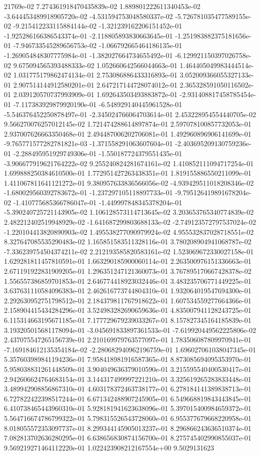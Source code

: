 21769e-02	7.274361918470435839e-02	1.889801222611340453e-02	-3.644453489918905720e-02	-4.531594753048580337e-02	-5.726781035477589155e-02	-9.215412233115884144e-02	-1.321239162206151452e-01	-1.925286166386543374e-01	-2.118805893830663645e-01	-1.251983882375181656e-01	-7.946733545289656753e-02	-1.066792665464186135e-01	-1.269054848307775984e-01	-1.382027664734655492e-01	-6.129921150397026758e-02	9.675094565393488333e-02	1.052660642566044663e-01	1.464405049983444514e-02	1.031775179862474134e-01	2.753086886433316893e-01	3.052009366055327133e-01	2.907514144912580201e-01	2.647217144728074012e-01	2.365328591050116502e-01	2.039120570737993909e-01	1.692643503493883872e-01	-2.931408817458785454e-01	-7.117383929879920190e-01	-6.548929140445961528e-01	-5.546376452250878497e-01	-2.345024766064703614e-01	2.453228954554440705e-02	9.566270076257012145e-02	1.721474288614897874e-01	2.597078100857732053e-01	2.937007626663350468e-01	2.494487006202706081e-01	1.492960896906141699e-01	-9.765771577282781821e-03	-1.371558291063607604e-01	-2.403695209130759236e-01	-2.288495951929749306e-01	-1.550187724379551435e-01	-3.906677919621764222e-02	9.255240824281674161e-02	1.410852111094717254e-01	1.699888250384610500e-01	1.772951427263438351e-01	1.819155886550211099e-01	1.411067811641121272e-01	9.380957633836566056e-02	-4.939429511018208346e-02	-1.680029560392783672e-01	-1.237297105118897733e-01	-9.795126419891678204e-02	-1.410775685366786047e-01	-1.449997848345378204e-01	-5.390240725721143905e-02	1.106128573114713645e-02	3.203653765340774839e-02	2.482212402519948929e-02	-1.641687299803688133e-02	-2.749123572797537024e-02	-1.220104413820890903e-02	1.495538277090979924e-02	4.955532837028718551e-02	8.327647085535290483e-02	1.165851583511328116e-01	3.780208904941068787e-02	-7.336239754504374211e-02	2.212193585820583161e-02	1.523069672330027158e-01	1.629281811457810591e-01	1.663290185900060114e-01	2.263500976151336663e-01	2.671191922831909205e-01	1.296351247121360073e-01	3.767895170667428378e-02	1.556557386859701853e-01	2.646774418923032446e-01	3.483235706771449225e-01	3.637631110584096383e-01	2.462616773744804310e-01	1.932064019547694300e-01	2.292630952751798512e-01	2.184379811767918622e-01	1.607534559277664366e-01	2.158904415434284296e-01	3.524983282690659636e-01	4.835007941128243725e-01	6.115314663195671185e-01	7.177729679239033267e-01	8.157827345164185839e-01	3.193205015681178094e-01	-3.045691833897361533e-01	-7.619920449562225806e-02	2.437075547265156739e-01	2.210169979763577097e-01	1.783506087809970941e-01	-7.169184612135354184e-02	-2.280682940962196759e-01	1.696027061038047345e-01	5.357603989841194236e-01	7.958418981916587365e-01	8.873085694095353970e-01	5.958038831261448509e-01	3.904049636379010590e-01	3.215595540400530417e-01	2.942606624764683154e-01	3.144317499997221210e-01	3.325619265283833448e-01	3.489942908856867310e-01	4.603178372463738177e-01	6.278184141389838713e-01	6.727822422398517244e-01	6.671342488907245905e-01	6.549668819843443845e-01	6.410738465443960310e-01	5.928181941623638096e-01	5.397015400984659372e-01	5.564716674786799322e-01	5.798315526543728060e-01	6.955377679668220958e-01	8.018055572353097737e-01	8.299344145905013237e-01	8.296866243636510374e-01	7.082813702636280295e-01	6.638656830874156700e-01	8.275745402990855037e-01	9.569219271464112220e-01	1.022423908212167554e+00	9.5029131623